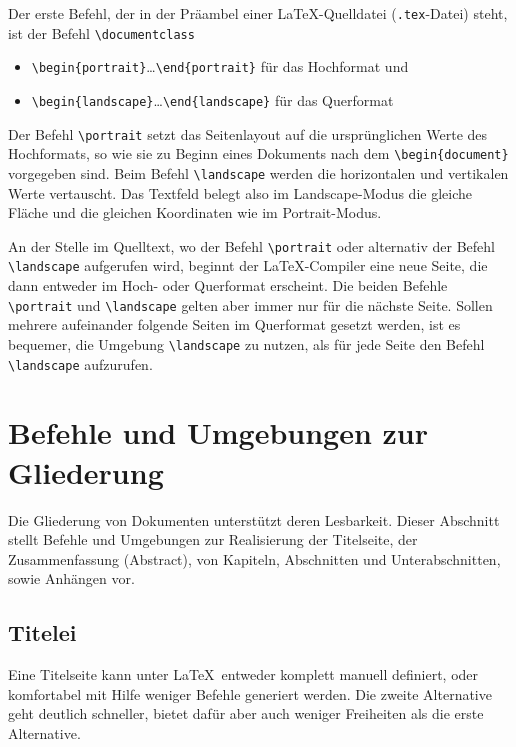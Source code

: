 Der erste Befehl, der in der Präambel einer \LaTeX-Quelldatei (\verb!.tex!-Datei) steht, ist der Befehl \verb!\documentclass!
\begin{document}
\begin{itemize}
\item \verb!\begin{portrait}!\dots\verb!\end{portrait}! für das Hochformat und
\item \verb!\begin{landscape}!\dots\verb!\end{landscape}! für das Querformat
\end{itemize}



Der Befehl \verb!\portrait! setzt das 
Seitenlayout auf die ursprünglichen Werte
des Hochformats, so wie sie zu
Beginn eines Dokuments nach dem
\verb!\begin{document}! vorgegeben sind.
Beim Befehl \verb!\landscape! werden 
die horizontalen und vertikalen Werte
vertauscht. Das Textfeld belegt also im Landscape-Modus die 
gleiche Fläche und die gleichen
Koordinaten wie im Portrait-Modus. 


An der Stelle im Quelltext, wo der  Befehl \verb!\portrait! oder alternativ der Befehl \verb!\landscape! aufgerufen wird, beginnt der \LaTeX-Compiler eine neue Seite, die dann entweder
im Hoch- oder Querformat erscheint. Die beiden Befehle \verb!\portrait! und \verb!\landscape! gelten aber immer nur für die nächste Seite. Sollen
mehrere aufeinander folgende Seiten im Querformat gesetzt werden,  
ist es bequemer, die Umgebung \verb!\landscape! zu 
nutzen, als für jede Seite den Befehl \verb!\landscape! aufzurufen.



\section{Befehle und Umgebungen zur Gliederung}


Die Gliederung von Dokumenten unterstützt deren Lesbarkeit. Dieser Abschnitt stellt Befehle und Umgebungen zur Realisierung der Titelseite, der Zusammenfassung (Abstract), von Kapiteln, Abschnitten und Unterabschnitten, sowie Anhängen vor.


\subsection{Titelei}

Eine Titelseite kann unter \LaTeX\ entweder komplett manuell definiert, oder komfortabel mit Hilfe weniger Befehle generiert werden. Die zweite Alternative geht deutlich schneller, bietet dafür aber auch weniger Freiheiten als die erste Alternative.
\end{document}
